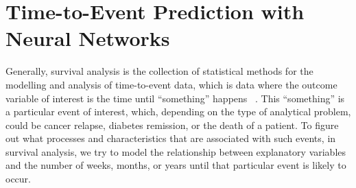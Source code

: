 \chapter{Time-to-Event Prediction with Neural Networks}
\label{survival-analysis}


Generally, 
survival analysis is the collection of statistical methods
for the modelling and analysis of time-to-event data,
which is data where the outcome variable of interest 
is the time until \enquote{something} happens~%
\autocite{kleinbaumSurvival2011}.
This \enquote{something} is a particular event of interest,
which, depending on the type of analytical problem, 
could be cancer relapse, 
diabetes remission,
or the death of a patient.
To figure out what processes and characteristics 
that are associated with such events, 
in survival analysis, we try to model the relationship between
explanatory variables and the number of weeks, months, or years 
until that particular event is likely to occur. 


